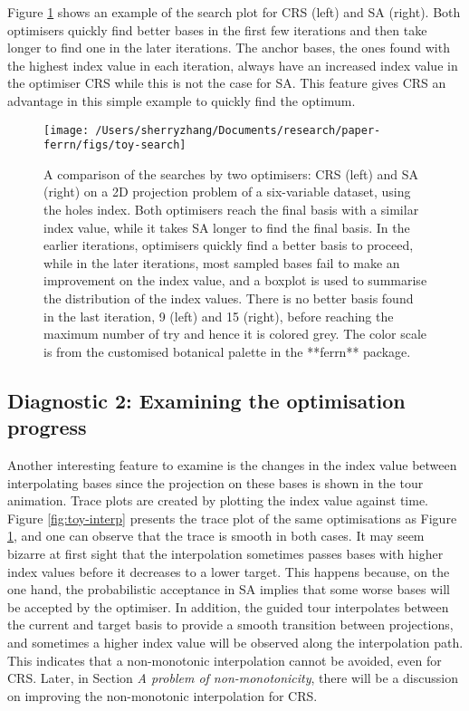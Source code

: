 Figure \ref{fig:toy-search} shows an example of the search plot for CRS
(left) and SA (right). Both optimisers quickly find better bases in the
first few iterations and then take longer to find one in the later
iterations. The anchor bases, the ones found with the highest index
value in each iteration, always have an increased index value in the
optimiser CRS while this is not the case for SA. This feature gives CRS
an advantage in this simple example to quickly find the optimum.

\begin{Schunk}
\begin{figure}

{\centering \texttt{[image: /Users/sherryzhang/Documents/research/paper-ferrn/figs/toy-search]} 

}

\caption[A comparison of the searches by two optimisers]{A comparison of the searches by two optimisers: CRS (left) and SA (right) on a 2D projection problem of a six-variable dataset,  using the holes index. Both optimisers reach the final basis with a similar index value, while it takes SA longer to find the final basis. In the earlier iterations, optimisers quickly find a better basis to proceed, while in the later iterations, most sampled bases fail to make an improvement on the index value, and a boxplot is used to summarise the distribution of the index values. There is no better basis found in the last iteration, 9 (left) and 15 (right), before reaching the maximum number of try and hence it is colored grey. The color scale is from the customised botanical palette in the **ferrn** package.}\label{fig:toy-search}
\end{figure}
\end{Schunk}

\hypertarget{toy-interp}{%
\subsection{Diagnostic 2: Examining the optimisation
progress}\label{toy-interp}}

Another interesting feature to examine is the changes in the index value
between interpolating bases since the projection on these bases is shown
in the tour animation. Trace plots are created by plotting the index
value against time. Figure \ref{fig:toy-interp} presents the trace plot
of the same optimisations as Figure \ref{fig:toy-search}, and one can
observe that the trace is smooth in both cases. It may seem bizarre at
first sight that the interpolation sometimes passes bases with higher
index values before it decreases to a lower target. This happens
because, on the one hand, the probabilistic acceptance in SA implies
that some worse bases will be accepted by the optimiser. In addition,
the guided tour interpolates between the current and target basis to
provide a smooth transition between projections, and sometimes a higher
index value will be observed along the interpolation path. This
indicates that a non-monotonic interpolation cannot be avoided, even for
CRS. Later, in Section \emph{A problem of non-monotonicity}, there will
be a discussion on improving the non-monotonic interpolation for CRS.


